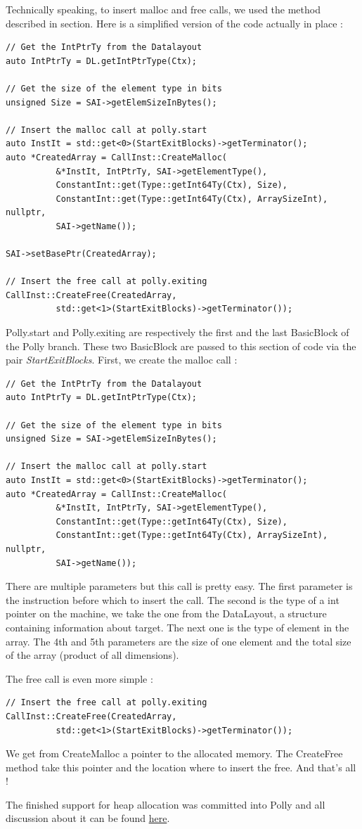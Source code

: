 Technically speaking, to insert malloc and free calls, we used the method described in section. Here is a simplified version of the code actually in place :
\begin{lstlisting}[frame=single]
// Get the IntPtrTy from the Datalayout
auto IntPtrTy = DL.getIntPtrType(Ctx);

// Get the size of the element type in bits
unsigned Size = SAI->getElemSizeInBytes();

// Insert the malloc call at polly.start
auto InstIt = std::get<0>(StartExitBlocks)->getTerminator();
auto *CreatedArray = CallInst::CreateMalloc(
          &*InstIt, IntPtrTy, SAI->getElementType(),
          ConstantInt::get(Type::getInt64Ty(Ctx), Size),
          ConstantInt::get(Type::getInt64Ty(Ctx), ArraySizeInt), nullptr,
          SAI->getName());

SAI->setBasePtr(CreatedArray);

// Insert the free call at polly.exiting
CallInst::CreateFree(CreatedArray,
          std::get<1>(StartExitBlocks)->getTerminator());
\end{lstlisting}
Polly.start and Polly.exiting are respectively the first and the last BasicBlock of the Polly branch. These two BasicBlock are passed to this section of code via the pair \emph{StartExitBlocks}.
First, we create the malloc call :
\begin{lstlisting}[frame=single]
// Get the IntPtrTy from the Datalayout
auto IntPtrTy = DL.getIntPtrType(Ctx);

// Get the size of the element type in bits
unsigned Size = SAI->getElemSizeInBytes();

// Insert the malloc call at polly.start
auto InstIt = std::get<0>(StartExitBlocks)->getTerminator();
auto *CreatedArray = CallInst::CreateMalloc(
          &*InstIt, IntPtrTy, SAI->getElementType(),
          ConstantInt::get(Type::getInt64Ty(Ctx), Size),
          ConstantInt::get(Type::getInt64Ty(Ctx), ArraySizeInt), nullptr,
          SAI->getName());
\end{lstlisting}
There are multiple parameters but this call is pretty easy. The first parameter is the instruction before which to insert the call. The second is the type of a int pointer on the machine, we take the one from the DataLayout, a structure containing information about target. The next one is the type of element in the array. The 4th and 5th parameters are the size of one element and the total size of the array (product of all dimensions).

The free call is even more simple :
\begin{lstlisting}[frame=single]
// Insert the free call at polly.exiting
CallInst::CreateFree(CreatedArray,
          std::get<1>(StartExitBlocks)->getTerminator());
\end{lstlisting}
We get from CreateMalloc a pointer to the allocated memory. The CreateFree method take this pointer and the location where to insert the free. And that's all !

The finished support for heap allocation was committed into Polly and all discussion about it can be found \href{https://reviews.llvm.org/D33688}{here}.